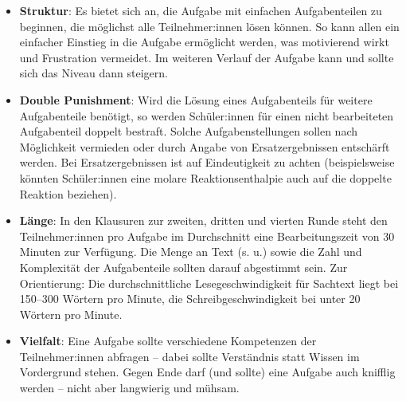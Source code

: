 \documentclass[../main.tex]{subfiles}
\begin{document}
\begin{itemize}
    \item \textbf{Struktur}: Es bietet sich an, die Aufgabe mit einfachen Aufgabenteilen zu beginnen, die m\"oglichst alle Teilnehmer:innen l\"osen k\"onnen. So kann allen ein einfacher Einstieg in die Aufgabe erm\"oglicht werden, was motivierend wirkt und Frustration vermeidet. Im weiteren Verlauf der Aufgabe kann und sollte sich das Niveau dann steigern. 
    \item \textbf{Double Punishment}: Wird die L\"osung eines Aufgabenteils f\"ur weitere Aufgabenteile ben\"otigt, so werden Sch\"uler:innen f\"ur einen nicht bearbeiteten Aufgabenteil doppelt bestraft. Solche Aufgabenstellungen sollen nach M\"oglichkeit vermieden oder durch Angabe von Ersatzergebnissen entsch\"arft werden. Bei Ersatzergebnissen ist auf Eindeutigkeit zu achten (beispielsweise k\"onnten Sch\"uler:innen eine molare Reaktionsenthalpie auch auf die doppelte Reaktion beziehen).
    \item \textbf{L\"ange}: In den Klausuren zur zweiten, dritten und vierten Runde steht den Teilnehmer:innen pro Aufgabe im Durchschnitt eine Bearbeitungszeit von 30 Minuten zur Verf\"ugung. Die Menge an Text (s. u.) sowie die Zahl und Komplexit\"at der Aufgabenteile sollten darauf abgestimmt sein. Zur Orientierung: Die durchschnittliche Lesegeschwindigkeit f\"ur Sachtext liegt bei 150--300 W\"ortern pro Minute, die Schreibgeschwindigkeit bei unter 20 W\"ortern pro Minute.
    \item \textbf{Vielfalt}: Eine Aufgabe sollte verschiedene Kompetenzen der Teilnehmer:innen abfragen -- dabei sollte Verst\"andnis statt Wissen im Vordergrund stehen. Gegen Ende darf (und sollte) eine Aufgabe auch knifflig werden -- nicht aber langwierig und m\"uhsam. 
\end{itemize}
\pagebreak
\end{document}
